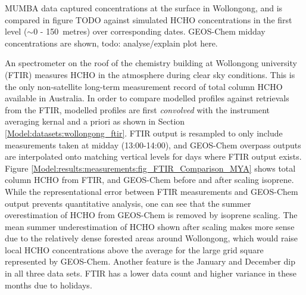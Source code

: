     
    
    MUMBA data captured concentrations at the surface in Wollongong, and is compared in figure TODO against simulated HCHO concentrations in the first level ($\sim$0 - 150~metres) over corresponding dates.
    GEOS-Chem midday concentrations are shown, todo: analyse/explain plot here.
    
    An spectrometer on the roof of the chemistry building at Wollongong university (FTIR) measures HCHO in the atmosphere during clear sky conditions.
    This is the only non-satellite long-term measurement record of total column HCHO available in Australia.
    In order to compare modelled profiles against retrievals from the FTIR, modelled profiles are first \textit{convolved} with the instrument averaging kernal and a priori as shown in Section \ref{Model:datasets:wollongong_ftir}.
    FTIR output is resampled to only include measurements taken at midday (13:00-14:00), and GEOS-Chem overpass outputs are interpolated onto matching vertical levels for days where FTIR output exists.
    Figure \ref{Model:results:measurements:fig_FTIR_Comparison_MYA} shows total column HCHO from FTIR, and GEOS-Chem before and after scaling isoprene.
    While the representational error between FTIR measurements and GEOS-Chem output prevents quantitative analysis, one can see that the summer overestimation of HCHO from GEOS-Chem is removed by isoprene scaling.
    The mean summer underestimation of HCHO shown after scaling makes more sense due to the relatively dense forested areas around Wollongong, which would raise local HCHO concentrations above the average for the large grid square represented by GEOS-Chem.
    Another feature is the January and December dip in all three data sets.
    FTIR has a lower data count and higher variance in these months due to holidays.
    
